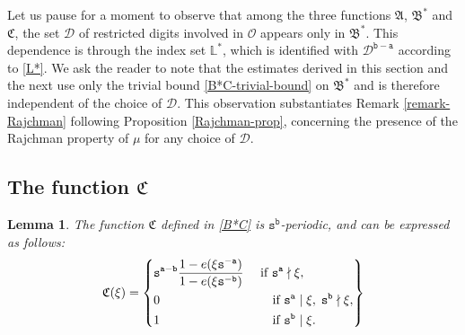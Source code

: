 \documentclass[12pt, twoside]{article}
\newtheorem{lemma}[theorem]{Lemma}
\theoremstyle{definition}
\numberwithin{equation}{section}
\begin{document}
Let us pause for a moment to observe that among the three functions $\mathfrak A$, $\mathfrak B^{\ast}$ and $\mathfrak C$, the set $\mathscr{D}$ of restricted digits involved in $\mathscr{O}$ appears only in $\mathfrak B^{\ast}$. This dependence is through the index set $\mathbb L^{\ast}$, which is identified with $\mathscr{D}^{\mathtt b - \mathtt a}$ according to \eqref{L*}. We ask the reader to note that the estimates derived in this section and the next use only the trivial bound \eqref{B*C-trivial-bound} on $\mathfrak B^{\ast}$ and is therefore independent of the choice of $\mathscr{D}$.  This observation substantiates Remark \ref{remark-Rajchman} following Proposition \ref{Rajchman-prop}, concerning the presence of the Rajchman property of $\mu$ for any choice of $\mathcal D$. 
\subsection{The function $\mathfrak C$} \label{C-section} 
\begin{lemma} \label{BC-lemma}
The function 
$\mathfrak C$ defined in \eqref{B*C} is $\mathtt s^{\mathtt b}$-periodic, and can be expressed as follows: 
\begin{equation}  
\label{C} 
\mathfrak C(\xi) = \left\{ 
\begin{aligned} &\mathtt s^{\mathtt a - \mathtt b}\frac{1 - e(\xi \mathtt s^{-\mathtt a})}{1 - e(\xi \mathtt s^{-\mathtt b})} \quad \text{ if } \mathtt s^{\mathtt a} \nmid \xi, \\
&0 \hskip1.2in \text{ if  } \mathtt s^{\mathtt a} \mid \xi, \; \mathtt s^{\mathtt b} \nmid \xi, \\  
&1 \hskip1.2in  \text{ if } \mathtt s^{\mathtt b} \mid \xi.  
\end{aligned} \right\}
\end{equation} 
\end{lemma} 
\end{document}
